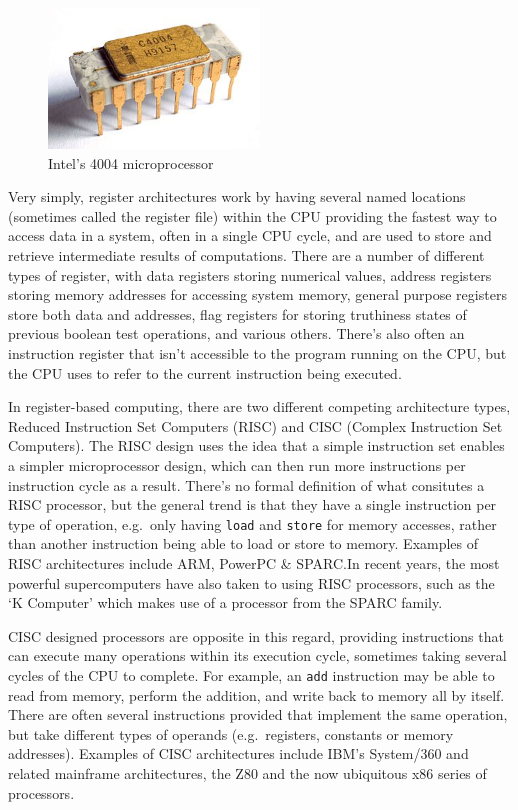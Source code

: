 \begin{figure}
  \includegraphics[width=0.5\textwidth]{imgs/Intel_C4004}
  \caption{Intel's 4004 microprocessor}\label{fig:4004}
\end{figure}

Very simply, register architectures work by having several named locations
(sometimes called the register file) within the CPU providing the fastest way to
access data in a system, often in a single CPU cycle, and are used to store and
retrieve intermediate results of computations. There are a number of different
types of register, with data registers storing numerical values, address
registers storing memory addresses for accessing system memory, general purpose
registers store both data and addresses, flag registers for storing truthiness
states of previous boolean test operations, and various others. There's also
often an instruction register that isn't accessible to the program running on
the CPU, but the CPU uses to refer to the current instruction being executed.
\cite{Mittal2016RegisterFile}\cite{Patterson2011Computer}

In register-based computing, there are two different competing architecture
types, Reduced Instruction Set Computers (RISC) and CISC (Complex Instruction
Set Computers). The RISC design uses the idea that a simple instruction set
enables a simpler microprocessor design, which can then run more instructions
per instruction cycle as a result. There's no formal definition of what
consitutes a RISC processor, but the general trend is that they have a single
instruction per type of operation, e.g.\ only having \texttt{load} and
\texttt{store} for memory accesses, rather than another instruction being able
to load or store to memory. Examples of RISC architectures include ARM, PowerPC
\& SPARC.\@ In recent years, the most powerful supercomputers have also taken to
using RISC processors, such as the `K Computer' which makes use of a processor
from the SPARC family.\cite{Yokokawa2011KCJ}

CISC designed processors are opposite in this regard, providing instructions
that can execute many operations within its execution cycle, sometimes taking
several cycles of the CPU to complete. For example, an \texttt{add} instruction
may be able to read from memory, perform the addition, and write back to memory
all by itself. There are often several instructions provided that implement the
same operation, but take different types of operands (e.g.\ registers, constants
or memory addresses). Examples of CISC architectures include IBM's System/360
and related mainframe architectures, the Z80 and the now ubiquitous x86 series
of processors.\cite{Patterson1980CRI}

